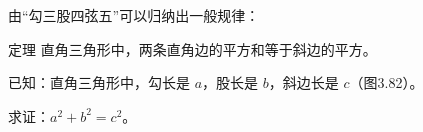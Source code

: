 \begin{figure}
    \begin{minipage}[t]{0.35\linewidth}
    \centering
{}
    \caption{}
    \end{minipage}
    \begin{minipage}[t]{0.58\linewidth}
    \centering
    \begin{tikzpicture}[>=latex, scale=.6]

    \end{tikzpicture}
    \caption{}
    \end{minipage}
    \end{figure}

由“勾三股四弦五”可以归纳出一般规律：

\begin{Theorem}[勾股定理]{定理} 
  直角三角形中，两条直角边的平方和等于斜边的平方。 
\end{Theorem}

已知：直角三角形中，勾长是 $a$，股长是 $b$，斜边长是 $c$（图3.82）。

求证：$a^2+b^2=c^2$。

